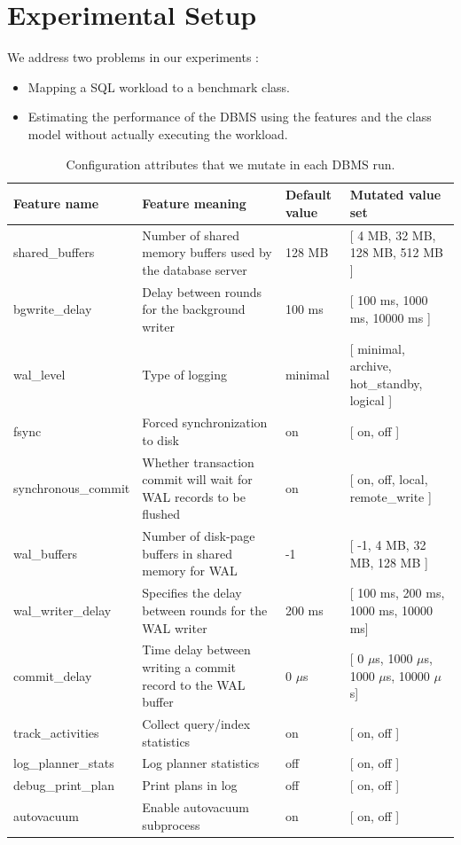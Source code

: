 \section{Experimental Setup} \label{sec:eval}

We address two problems in our experiments :\\

\begin{itemize}
	\item Mapping a SQL workload to a benchmark class.
	\item Estimating the performance of the DBMS using the features and the class
	model without actually executing the workload.\\
\end{itemize}

\begin{table}
\centering
  \begin{adjustbox}{max width=\textwidth}
  \begin{tabular}{l|lll}
	\toprule
   		Feature name &  Feature meaning & Default value & Mutated value set \\
    \midrule
    	shared\_buffers & Number of shared memory buffers used by the database
    	server & 128 MB &  [ 4 MB, 32 MB, 128 MB, 512 MB ] \\
    	bgwrite\_delay &  Delay between rounds for the
    	background writer & 100 ms &  [ 100 ms, 1000 ms, 10000 ms ] \\
    	wal\_level & Type of logging & minimal &  [ minimal, archive, hot\_standby,
    	logical ] \\
    	fsync & Forced synchronization to disk & on &  [ on, off ] \\
    	synchronous\_commit & Whether transaction commit will wait for WAL records to be flushed & on &  [ on, off, local,
    	remote\_write ] \\
    	wal\_buffers & Number of disk-page buffers in shared memory for WAL &
    	-1 &  [ -1, 4 MB, 32 MB, 128 MB ] \\
    	wal\_writer\_delay & Specifies the delay between rounds for the
    	WAL writer & 200 ms &  [ 100 ms, 200 ms, 1000 ms, 10000 ms] \\
    	commit\_delay & Time delay between writing a commit record to the WAL
    	buffer & 0 $\mu$s &  [ 0 $\mu$s, 1000 $\mu$s, 1000 $\mu$s, 10000 $\mu$s] \\
    	track\_activities & Collect query/index statistics  & on &  [ on, off ]	\\
    	log\_planner\_stats & Log planner statistics  & off &  [ on, off ] \\
    	debug\_print\_plan & Print plans in log  & off &  [ on, off ] \\
    	autovacuum & Enable autovacuum subprocess  & on &  [ on, off ] \\
   \bottomrule
   \end{tabular}
   \end{adjustbox}
\caption{Configuration attributes that we mutate in each DBMS run.}
\label{tab:mutate}
\end{table}

